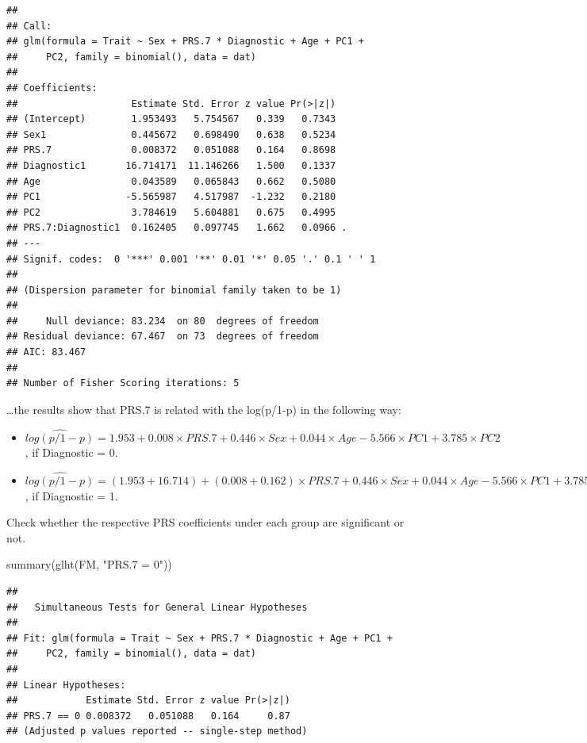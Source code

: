 \documentclass[
]{article}
\newenvironment{Shaded}{\begin{snugshade}}{\end{snugshade}}
\newcommand{\FunctionTok}[1]{\textcolor[rgb]{0.00,0.00,0.00}{#1}}
\newcommand{\NormalTok}[1]{#1}
\newcommand{\StringTok}[1]{\textcolor[rgb]{0.31,0.60,0.02}{#1}}
\begin{document}
\begin{verbatim}
## 
## Call:
## glm(formula = Trait ~ Sex + PRS.7 * Diagnostic + Age + PC1 + 
##     PC2, family = binomial(), data = dat)
## 
## Coefficients:
##                    Estimate Std. Error z value Pr(>|z|)  
## (Intercept)        1.953493   5.754567   0.339   0.7343  
## Sex1               0.445672   0.698490   0.638   0.5234  
## PRS.7              0.008372   0.051088   0.164   0.8698  
## Diagnostic1       16.714171  11.146266   1.500   0.1337  
## Age                0.043589   0.065843   0.662   0.5080  
## PC1               -5.565987   4.517987  -1.232   0.2180  
## PC2                3.784619   5.604881   0.675   0.4995  
## PRS.7:Diagnostic1  0.162405   0.097745   1.662   0.0966 .
## ---
## Signif. codes:  0 '***' 0.001 '**' 0.01 '*' 0.05 '.' 0.1 ' ' 1
## 
## (Dispersion parameter for binomial family taken to be 1)
## 
##     Null deviance: 83.234  on 80  degrees of freedom
## Residual deviance: 67.467  on 73  degrees of freedom
## AIC: 83.467
## 
## Number of Fisher Scoring iterations: 5
\end{verbatim}

\ldots the results show that PRS.7 is related with the log(p/1-p) in the
following way:

\begin{itemize}
\item
  \(\widehat{log(p/1-p)} = 1.953 + 0.008\times PRS.7 + 0.446\times Sex + 0.044\times Age - 5.566\times PC1 + 3.785\times PC2\),
  if Diagnostic = 0.
\item
  \(\widehat{log(p/1-p)} = (1.953+16.714) + (0.008+0.162)\times PRS.7 + 0.446\times Sex + 0.044\times Age - 5.566\times PC1 + 3.785\times PC2\),
  if Diagnostic = 1.
\end{itemize}

Check whether the respective PRS coefficients under each group are
significant or not.

\begin{Shaded}
\begin{Highlighting}[]
\FunctionTok{summary}\NormalTok{(}\FunctionTok{glht}\NormalTok{(FM, }\StringTok{"PRS.7 = 0"}\NormalTok{))}
\end{Highlighting}
\end{Shaded}

\begin{verbatim}
## 
##   Simultaneous Tests for General Linear Hypotheses
## 
## Fit: glm(formula = Trait ~ Sex + PRS.7 * Diagnostic + Age + PC1 + 
##     PC2, family = binomial(), data = dat)
## 
## Linear Hypotheses:
##            Estimate Std. Error z value Pr(>|z|)
## PRS.7 == 0 0.008372   0.051088   0.164     0.87
## (Adjusted p values reported -- single-step method)
\end{verbatim}
\end{document}
